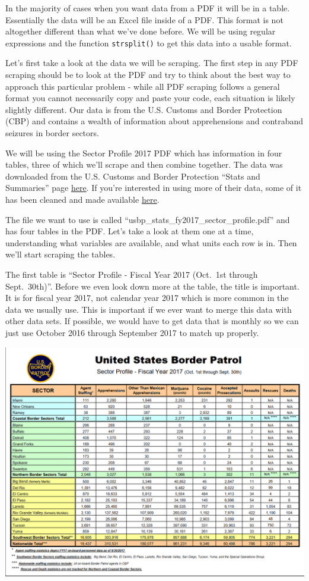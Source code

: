 \documentclass[
  12pt,
  openany]{book}
\begin{document}
In the majority of cases when you want data from a PDF it will be in a table. Essentially the data will be an Excel file inside of a PDF. This format is not altogether different than what we've done before. We will be using regular expressions and the function \texttt{strsplit()} to get this data into a usable format.

Let's first take a look at the data we will be scraping. The first step in any PDF scraping should be to look at the PDF and try to think about the best way to approach this particular problem - while all PDF scraping follows a general format you cannot necessarily copy and paste your code, each situation is likely slightly different. Our data is from the U.S. Customs and Border Protection (CBP) and contains a wealth of information about apprehensions and contraband seizures in border sectors.

We will be using the Sector Profile 2017 PDF which has information in four tables, three of which we'll scrape and then combine together. The data was downloaded from the U.S. Customs and Border Protection ``Stats and Summaries'' page \href{https://www.cbp.gov/newsroom/media-resources/stats}{here}. If you're interested in using more of their data, some of it has been cleaned and made available \href{https://www.openicpsr.org/openicpsr/project/109522/version/V2/view}{here}.

The file we want to use is called ``usbp\_stats\_fy2017\_sector\_profile.pdf'' and has four tables in the PDF. Let's take a look at them one at a time, understanding what variables are available, and what units each row is in. Then we'll start scraping the tables.

The first table is ``Sector Profile - Fiscal Year 2017 (Oct.~1st through Sept.~30th)''. Before we even look down more at the table, the title is important. It is for fiscal year 2017, not calendar year 2017 which is more common in the data we usually use. This is important if we ever want to merge this data with other data sets. If possible, we would have to get data that is monthly so we can just use October 2016 through September 2017 to match up properly.

\includegraphics{images/pdf_table_1.PNG}
\end{document}

